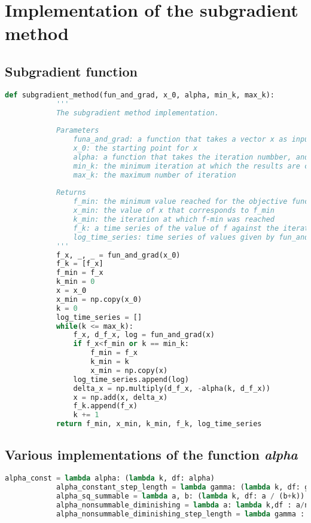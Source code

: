 \documentclass[11pt]{article}
\begin{document}
\section{Implementation of the subgradient method}
\label{appendix: subgradient method}
    \subsection{Subgradient function}
        \begin{lstlisting}[language=Python]
                def subgradient_method(fun_and_grad, x_0, alpha, min_k, max_k):
            '''
            The subgradient method implementation.
            
            Parameters
                funa_and_grad: a function that takes a vector x as input, and returns the value of the function f(x), and a vector corresponding the the gradient df(x)
                x_0: the starting point for x
                alpha: a function that takes the iteration numbber, and the gradient, and returns the step size alpha
                min_k: the minimum iteration at which the results are considered
                max_k: the maximum number of iteration
            
            Returns
                f_min: the minimum value reached for the objective function f
                x_min: the value of x that corresponds to f_min
                k_min: the iteration at which f-min was reached
                f_k: a time series of the value of f against the iterations
                log_time_series: time series of values given by fun_and_grad that are stored as log   
            '''
            f_x, _, _ = fun_and_grad(x_0)
            f_k = [f_x]
            f_min = f_x
            k_min = 0
            x = x_0
            x_min = np.copy(x_0)
            k = 0
            log_time_series = []
            while(k <= max_k):
                f_x, d_f_x, log = fun_and_grad(x)
                if f_x<f_min or k == min_k:
                    f_min = f_x
                    k_min = k
                    x_min = np.copy(x)
                log_time_series.append(log)
                delta_x = np.multiply(d_f_x, -alpha(k, d_f_x))
                x = np.add(x, delta_x)
                f_k.append(f_x)
                k += 1
            return f_min, x_min, k_min, f_k, log_time_series
        \end{lstlisting}

    \subsection{Various implementations of the function \emph{alpha}}
        \begin{lstlisting}[language=Python]
            alpha_const = lambda alpha: (lambda k, df: alpha)
            alpha_constant_step_length = lambda gamma: (lambda k, df: gamma/np.linalg.norm(df))
            alpha_sq_summable = lambda a, b: (lambda k, df: a / (b+k))
            alpha_nonsummable_diminishing = lambda a: lambda k,df : a/np.sqrt(k+1)
            alpha_nonsummable_diminishing_step_length = lambda gamma : lambda k, df : gamma/np.linalg.norm(df)/np.sqrt(k+1)
        \end{lstlisting}
\end{document}
